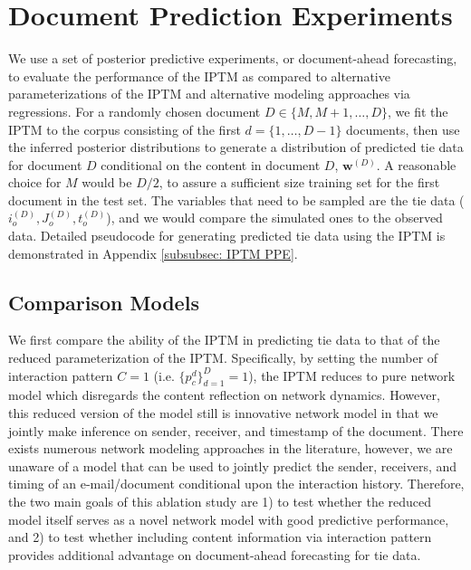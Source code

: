   \section{Document Prediction Experiments} \label{sec:PosteriorPredictive}
 We use a set of posterior predictive experiments, or document-ahead forecasting, to evaluate the performance of the IPTM as compared to alternative parameterizations of the IPTM and alternative modeling approaches via regressions. For a randomly chosen document $D \in \{M,M+1,\hdots, D\}$, we fit the IPTM to the corpus consisting of the first $d = \{1,\hdots,D-1\}$ documents, then use the inferred posterior distributions to generate a distribution of predicted tie data for document $D$ conditional on the content in document $D$, $\boldsymbol{w}^{(D)}$.  A reasonable choice for $M$ would be $D/2$, to assure a sufficient size training set for the first document in the test set. The variables that need to be sampled are the tie data ($i_o^{(D)}, J_o^{(D)}, t_o^{(D)}$), and we would compare the simulated ones to the observed data. Detailed pseudocode for generating predicted tie data using the IPTM is demonstrated in Appendix \ref{subsubsec: IPTM PPE}.

\subsection{Comparison Models}\label{subsec:ComparisonModels}
We first compare the ability of the IPTM in predicting tie data to that of the reduced parameterization of the IPTM. Specifically, by setting the number of interaction pattern $C = 1$ (i.e. $\{p_c^{d}\}_{d=1}^D = 1$), the IPTM reduces to pure network model which disregards the content reflection on network dynamics. However, this reduced version of the model still is innovative network model in that we jointly make inference on sender, receiver, and timestamp of the document. There exists numerous network modeling approaches in the literature, however, we are unaware of a model that can be used to jointly predict the sender, receivers, and timing of an e-mail/document conditional upon the interaction history. Therefore, the two main goals of this ablation study are 1) to test whether the reduced model itself serves as a novel network model with good predictive performance, and 2) to test whether including content information via interaction pattern provides additional advantage on document-ahead forecasting for tie data.

